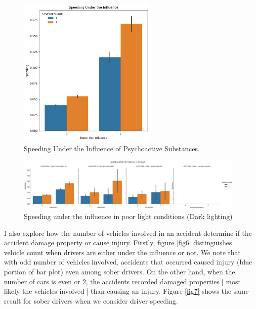 \documentclass[a4paper,12pt]{article}
\begin{document}
\begin{figure}[H]
	\centering
	\includegraphics[width=0.6\textwidth]{un_sp_sev.jpg}
	\caption{Speeding Under the Influence of Psychoactive Substances.}
	\label{fig4}
\end{figure}

\begin{figure}[H]
	\centering
	\includegraphics[width=1.1\textwidth]{un_sp_sev_lig.jpg}
	\caption{Speeding under the influence in poor light conditions (Dark lighting)}
	\label{fig5}
\end{figure}


I also explore how the number of vehicles involved in an accident determine if the accident damage property or cause injury. Firstly, figure \ref{fig6} distinguishes vehicle count when drivers are either under the influence or not. We note that with odd number of vehicles involved, accidents that occurred caused injury (blue portion of bar plot) even among sober drivers. On the other hand, when the number of cars is even or 2, the accidents recorded damaged properties | most likely the vehicles involved | than causing an injury. Figure \ref{fig7} shows the same result for sober drivers when we consider driver speeding.\\
\end{document}
